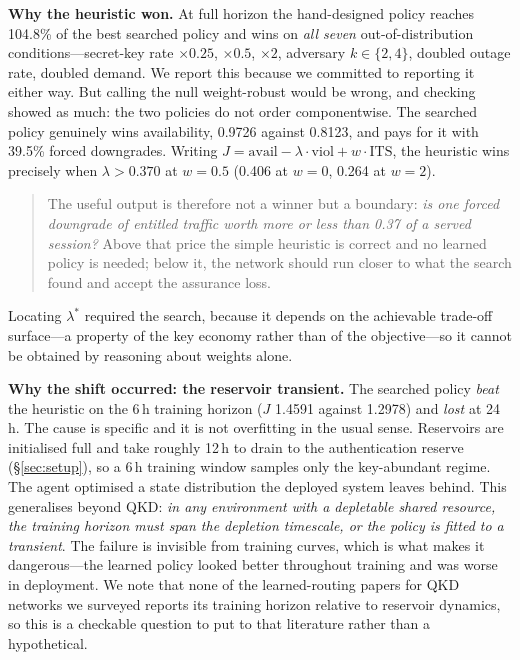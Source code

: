 \documentclass[conference]{IEEEtran}
\begin{document}
\textbf{Why the heuristic won.} At full horizon the hand-designed policy reaches
104.8\% of the best searched policy and wins on \emph{all seven}
out-of-distribution conditions---secret-key rate $\times0.25$, $\times0.5$,
$\times2$, adversary $k\in\{2,4\}$, doubled outage rate, doubled demand. We
report this because we committed to reporting it either way. But calling the null
weight-robust would be wrong, and checking showed as much: the two policies do not
order componentwise. The searched policy genuinely wins availability, 0.9726
against 0.8123, and pays for it with 39.5\% forced downgrades. Writing
$J=\text{avail}-\lambda\cdot\text{viol}+w\cdot\text{ITS}$, the heuristic wins
precisely when $\lambda>0.370$ at $w=0.5$ (0.406 at $w=0$, 0.264 at $w=2$).

\begin{quote}
The useful output is therefore not a winner but a boundary: \emph{is one forced
downgrade of entitled traffic worth more or less than 0.37 of a served session?}
Above that price the simple heuristic is correct and no learned policy is needed;
below it, the network should run closer to what the search found and accept the
assurance loss.
\end{quote}

Locating $\lambda^\ast$ required the search, because it depends on the achievable
trade-off surface---a property of the key economy rather than of the objective---so
it cannot be obtained by reasoning about weights alone.

\textbf{Why the shift occurred: the reservoir transient.} The searched policy
\emph{beat} the heuristic on the 6\,h training horizon ($J$ 1.4591 against
1.2978) and \emph{lost} at 24\,h. The cause is specific and it is not overfitting
in the usual sense. Reservoirs are initialised full and take roughly 12\,h to
drain to the authentication reserve (\S\ref{sec:setup}), so a 6\,h training window
samples only the key-abundant regime. The agent optimised a state distribution the
deployed system leaves behind. This generalises beyond QKD: \emph{in any
environment with a depletable shared resource, the training horizon must span the
depletion timescale, or the policy is fitted to a transient}. The failure is
invisible from training curves, which is what makes it dangerous---the learned
policy looked better throughout training and was worse in deployment. We note
that none of the learned-routing papers for QKD networks we surveyed reports its
training horizon relative to reservoir dynamics, so this is a checkable question
to put to that literature rather than a hypothetical.
\end{document}
